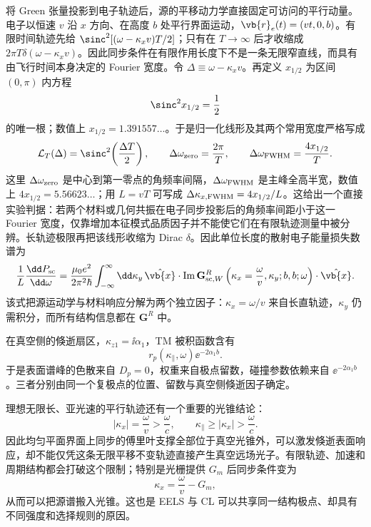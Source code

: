 将 Green 张量投影到电子轨迹后，源的平移动力学直接固定可访问的平行动量。电子以恒速 $v$ 沿 $x$ 方向、在高度 $b$ 处平行界面运动，$\vb{r}_e(t)=(vt,0,b)$。有限时间轨迹先给 $\sinc^2[(\omega-\kappa_xv)T/2]$；只有在 $T\to\infty$ 后才收缩成 $2\pi T\delta(\omega-\kappa_xv)$。因此同步条件在有限作用长度下不是一条无限窄直线，而具有由飞行时间本身决定的 Fourier 宽度。令 $\Delta\equiv\omega-\kappa_xv$。再定义 $x_{1/2}$ 为区间 $(0,\pi)$ 内方程
\begin{equation*}
 \sinc^2x_{1/2}=\frac12
\end{equation*}
的唯一根；数值上 $x_{1/2}=1.391557\ldots$。于是归一化线形及其两个常用宽度严格写成
\begin{equation}
{
\mathcal L_T(\Delta)=\sinc^2\!\left(\frac{\Delta T}{2}\right),
\qquad
\Delta\omega_{\rm zero}=\frac{2\pi}{T},
\qquad
\Delta\omega_{\rm FWHM}=\frac{4x_{1/2}}{T}.}
\label{eq:finite-trajectory-sync-linewidth-dp83}
\end{equation}
这里 $\Delta\omega_{\rm zero}$ 是中心到第一零点的角频率间隔，$\Delta\omega_{\rm FWHM}$ 是主峰全高半宽，数值上 $4x_{1/2}=5.56623\ldots$；用 $L=vT$ 可写成 $\Delta\kappa_{x,{\rm FWHM}}=4x_{1/2}/L$。这给出一个直接实验判据：若两个材料或几何共振在电子同步投影后的角频率间距小于这一 Fourier 宽度，仅靠增加本征模式品质因子并不能使它们在有限轨迹测量中被分辨。长轨迹极限再把该线形收缩为 Dirac $\delta$。因此单位长度的散射电子能量损失数谱为
\begin{equation}
{
\frac1L\frac{\dd P_{\rm sc}}{\dd\omega}
=\frac{\mu_0e^2}{2\pi^2\hbar}
\int_{-\infty}^{\infty}\dd\kappa_y\,
\hat{\vb{x}}\cdot\operatorname{Im}\mathbf G_{{\rm sc},W}^R
\left(\kappa_x=\frac{\omega}{v},\kappa_y;b,b;\omega\right)
\cdot\hat{\vb{x}}.}
\label{eq:planar_eels_mixed_green_per_length}
\end{equation}
该式把源运动学与材料响应分解为两个独立因子：$\kappa_x=\omega/v$ 来自长直轨迹，$\kappa_y$ 仍需积分，而所有结构信息都在 $\mathbf G^R$ 中。

在真空侧的倏逝扇区，$\kappa_{z1}=\ii\alpha_1$，TM 被积函数含有
\begin{equation}
{r_p(\kappa_\parallel,\omega)\ee^{-2\alpha_1b}.}
\label{eq:surface_pole_distance_kernel}
\end{equation}
于是表面谱峰的色散来自 $D_p=0$，权重来自极点留数，碰撞参数依赖来自 $\ee^{-2\alpha_1b}$。三者分别由同一个复极点的位置、留数与真空侧倏逝因子确定。

理想无限长、亚光速的平行轨迹还有一个重要的光锥结论：
\begin{equation}
|\kappa_x|=\frac{\omega}{v}>\frac{\omega}{c},
\qquad \kappa_\parallel\ge |\kappa_x|>\frac{\omega}{c}.
\label{eq:parallel_electron_outside_light_cone}
\end{equation}
因此均匀平面界面上同步的傅里叶支撑全部位于真空光锥外，可以激发倏逝表面响应，却不能仅凭这条无限平移不变轨迹直接产生真空远场光子。有限轨迹、加速和周期结构都会打破这个限制；特别是光栅提供 $G_m$ 后同步条件变为
\begin{equation}
\kappa_x=\frac{\omega}{v}-G_m,
\label{eq:grating_light_cone_momentum_shift}
\end{equation}
从而可以把源谱搬入光锥。这也是 EELS 与 CL 可以共享同一结构极点、却具有不同强度和选择规则的原因。


